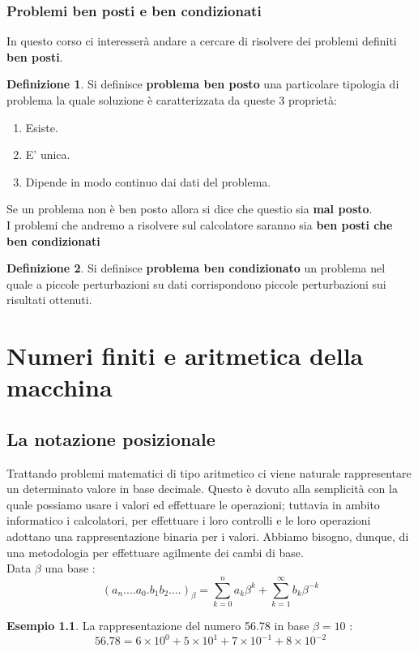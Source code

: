 \documentclass[12pt, a4paper]{book}
\theoremstyle{definition}
\newtheorem{exmp}{Esempio}[section]
\newtheorem{defn}{Definizione}[section]
\begin{document}
\subsection{Problemi ben posti e ben condizionati}
\begin{flushleft}

In questo corso ci interesserà andare a cercare di risolvere dei problemi definiti \textbf{ben posti}.

\begin{defn}
Si definisce \textbf{problema ben posto} una particolare tipologia di problema la quale soluzione è caratterizzata da queste 3 proprietà: 
\begin{enumerate}
\item Esiste.
\item E' unica.
\item Dipende in modo continuo dai dati del problema.
\end{enumerate}
\end{defn}
Se un problema non è ben posto allora si dice che questio sia \textbf{mal posto}.\\
I problemi che andremo a risolvere sul calcolatore saranno sia \textbf{ben posti che ben condizionati}
\begin{defn}
Si definisce \textbf{problema ben condizionato} un problema nel quale a piccole perturbazioni su dati corrispondono piccole perturbazioni sui risultati ottenuti.
\end{defn}
\end{flushleft}


\chapter{Numeri finiti e aritmetica della macchina}

\section{La notazione posizionale}
\begin{flushleft}
Trattando problemi matematici di tipo aritmetico ci viene naturale rappresentare un determinato valore in base decimale. Questo è dovuto alla semplicità con la quale possiamo usare i valori ed effettuare le operazioni; tuttavia in ambito informatico i calcolatori, per effettuare i loro controlli e le loro operazioni adottano una rappresentazione binaria per i valori. Abbiamo bisogno, dunque, di una metodologia per effettuare agilmente dei cambi di base.\\

Data $\beta$ una base :
\[ (a_{n}....a_{0}.b_{1}b_{2}....)_{\beta} = \sum_{k=0}^{n}a_{k}\beta^{k} + \sum_{k=1}^{\infty}b_{k}\beta^{-k} \]

\begin{exmp}
La rappresentazione del numero 56.78 in base $\beta = 10$ :
\[ 56.78 = 6 \times 10^{0} + 5 \times 10^{1} + 7 \times 10^{-1} + 8 \times 10^{-2} \]
\end{exmp}
\end{flushleft}
\end{document}
